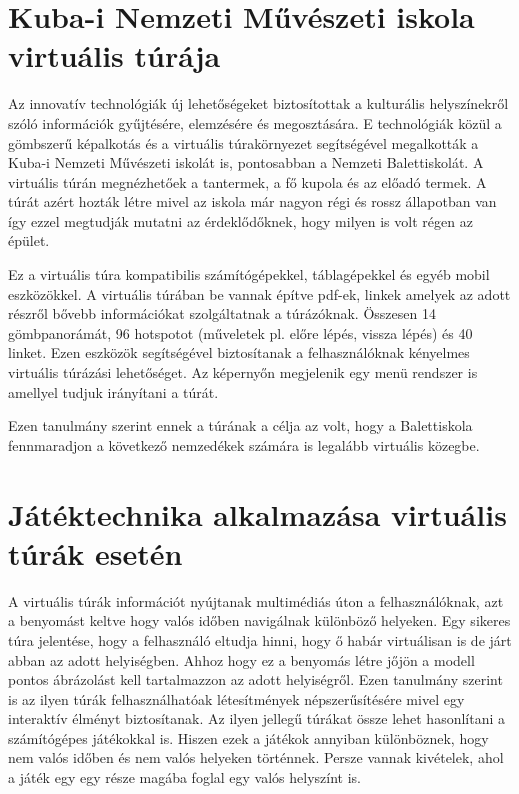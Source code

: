\section{Kuba-i Nemzeti Művészeti iskola virtuális túrája}

Az innovatív technológiák új lehetőségeket biztosítottak a kulturális helyszínekről szóló információk gyűjtésére, elemzésére és megosztására. E technológiák közül a gömbszerű képalkotás és a virtuális túrakörnyezet segítségével megalkották a Kuba-i Nemzeti Művészeti iskolát \cite{napolitano2017virtual} is, pontosabban a Nemzeti Balettiskolát. A virtuális túrán megnézhetőek a tantermek, a fő kupola és az előadó termek. A túrát azért hozták létre mivel az iskola már nagyon régi és rossz állapotban van így ezzel megtudják mutatni az érdeklődőknek, hogy milyen is volt régen az épület.

Ez a virtuális túra kompatibilis számítógépekkel, táblagépekkel és egyéb mobil eszközökkel. A virtuális túrában be vannak építve pdf-ek, linkek amelyek az adott részről bővebb információkat szolgáltatnak a túrázóknak. Összesen 14 gömbpanorámát, 96 hotspotot (műveletek pl. előre lépés, vissza lépés) és 40 linket. Ezen eszközök segítségével biztosítanak a felhasználóknak kényelmes virtuális túrázási lehetőséget. Az képernyőn megjelenik egy menü rendszer is amellyel tudjuk irányítani a túrát.

Ezen tanulmány szerint ennek a túrának a célja az volt, hogy a Balettiskola fennmaradjon a következő nemzedékek számára is legalább virtuális közegbe. 

\section{Játéktechnika alkalmazása virtuális túrák esetén}

A virtuális túrák információt nyújtanak multimédiás úton a felhasználóknak, azt a benyomást keltve hogy valós időben navigálnak különböző helyeken. Egy sikeres túra jelentése, hogy a felhasználó eltudja hinni, hogy ő habár virtuálisan is de járt abban az adott helyiségben. Ahhoz hogy ez a benyomás létre jőjön a modell pontos ábrázolást kell tartalmazzon az adott helyiségről. Ezen tanulmány szerint is az ilyen túrák felhasználhatóak létesítmények népszerűsítésére mivel egy interaktív élményt biztosítanak. Az ilyen jellegű túrákat össze lehet hasonlítani a számítógépes játékokkal is. Hiszen ezek a játékok annyiban különböznek, hogy nem valós időben és nem valós helyeken történnek. Persze vannak kivételek, ahol a játék egy egy része magába foglal egy valós helyszínt is. 

